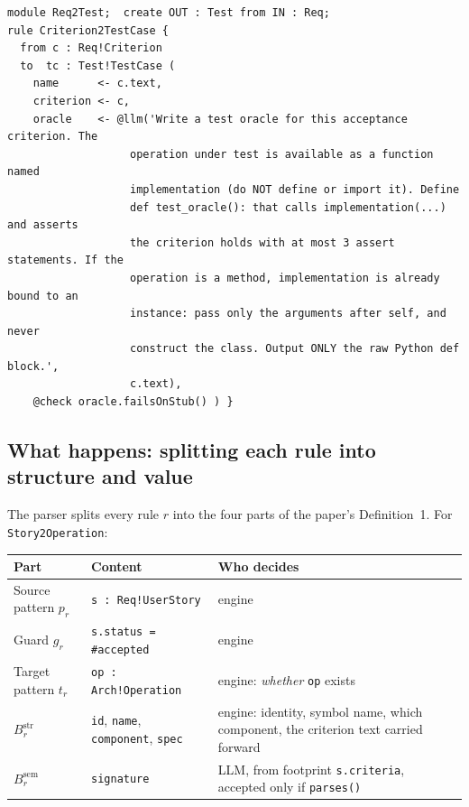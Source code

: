 \documentclass[10pt,a4paper]{article}
\newcommand{\str}{\mathrm{str}}
\newcommand{\sem}{\mathrm{sem}}
\newcommand{\code}[1]{\texttt{#1}}
\newcommand{\file}[1]{\texttt{#1}}
\theoremstyle{definition}
\begin{document}
\begin{lstlisting}[language=ATL, style=model, caption={\file{devbench_rules/Req2Test.agentm2m}.}, label={lst:req2test}]
module Req2Test;  create OUT : Test from IN : Req;
rule Criterion2TestCase {
  from c : Req!Criterion
  to  tc : Test!TestCase (
    name      <- c.text,
    criterion <- c,
    oracle    <- @llm('Write a test oracle for this acceptance criterion. The
                   operation under test is available as a function named
                   implementation (do NOT define or import it). Define
                   def test_oracle(): that calls implementation(...) and asserts
                   the criterion holds with at most 3 assert statements. If the
                   operation is a method, implementation is already bound to an
                   instance: pass only the arguments after self, and never
                   construct the class. Output ONLY the raw Python def block.',
                   c.text),
    @check oracle.failsOnStub() ) }
\end{lstlisting}

\subsection{What happens: splitting each rule into structure and value}

The parser splits every rule $r$ into the four parts of the paper's
Definition~1. For \code{Story2Operation}:

\begin{center}
\small
\begin{tabularx}{\textwidth}{@{}l l X@{}}
\toprule
Part & Content & Who decides \\
\midrule
Source pattern $p_r$ & \code{s : Req!UserStory} & engine \\
Guard $g_r$ & \code{s.status = \#accepted} & engine \\
Target pattern $t_r$ & \code{op : Arch!Operation} & engine: \emph{whether} \code{op} exists \\
$B^{\str}_r$ & \code{id}, \code{name}, \code{component}, \code{spec} & engine: identity, symbol name, which component, the criterion text carried forward \\
$B^{\sem}_r$ & \code{signature} & LLM, from footprint \code{s.criteria}, accepted only if \code{parses()} \\
\bottomrule
\end{tabularx}
\end{center}
\end{document}
